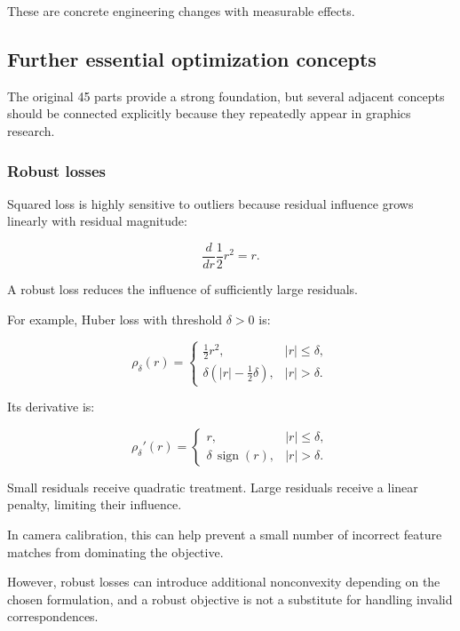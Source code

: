 These are concrete engineering changes with measurable effects.

\subsection{Further essential optimization concepts}\label{02-foundations-ii-ch028-further-essential-optimization-concepts}

\hypertarget{02-foundations-ii-ch028-further-essential-optimization-concepts}{}

The original 45 parts provide a strong foundation, but several adjacent concepts should be connected explicitly because they repeatedly appear in graphics research.

\subsubsection{Robust losses}\label{02-foundations-ii-ch028-robust-losses}

\hypertarget{02-foundations-ii-ch028-robust-losses}{}

Squared loss is highly sensitive to outliers because residual influence grows linearly with residual magnitude:

\[
\frac d{dr}\frac12r^2=r.
\]

A robust loss reduces the influence of sufficiently large residuals.

For example, Huber loss with threshold \(\delta>0\) is:

\[
\rho_\delta(r)= \begin{cases} \frac12r^2,&|r|\le\delta,\\ \delta(|r|-\frac12\delta),&|r|>\delta. \end{cases}
\]

Its derivative is:

\[
\rho_\delta'(r)= \begin{cases} r,&|r|\le\delta,\\ \delta\,\operatorname{sign}(r),&|r|>\delta. \end{cases}
\]

Small residuals receive quadratic treatment. Large residuals receive a linear penalty, limiting their influence.

In camera calibration, this can help prevent a small number of incorrect feature matches from dominating the objective.

However, robust losses can introduce additional nonconvexity depending on the chosen formulation, and a robust objective is not a substitute for handling invalid correspondences.

